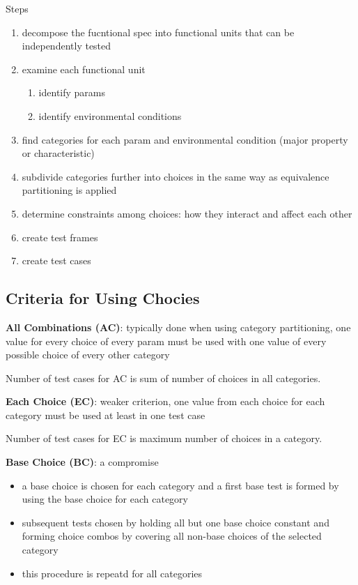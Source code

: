 \documentclass[11pt]{article}
\begin{document}
Steps
\begin{enumerate}
\item decompose the fucntional spec into functional units that can be independently
tested
\item examine each functional unit
\begin{enumerate}
\item identify params
\item identify environmental conditions
\end{enumerate}
\item find categories for each param and environmental condition (major property or
characteristic)
\item subdivide categories further into choices in the same way as equivalence partitioning
is applied
\item determine constraints among choices: how they interact and affect each other
\item create test frames
\item create test cases
\end{enumerate}
\subsection{Criteria for Using Chocies}
\label{sec:org8f4ae0b}
\textbf{All Combinations (AC)}: typically done when using category partitioning, one value
for every choice of every param must be used with one value of every possible
choice of every other category

Number of test cases for AC is sum of number of choices in all categories.

\textbf{Each Choice (EC)}: weaker criterion, one value from each choice for each category
must be used at least in one test case

Number of test cases for EC is maximum number of choices in a category.

\textbf{Base Choice (BC)}: a compromise
\begin{itemize}
\item a base choice is chosen for each category and a first base test is formed by using
the base choice for each category
\item subsequent tests chosen by holding all but one base choice constant and forming
choice combos by covering all non-base choices of the selected category
\item this procedure is repeatd for all categories
\end{itemize}
\end{document}
